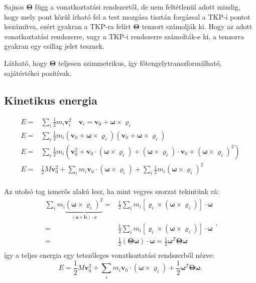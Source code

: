 \documentclass[12pt,a4paper]{scrartcl}
\let\mathbf\bm
\begin{document}
Sajnos ${\mathbf{\Theta }}$ függ a vonatkoztatási rendszertől, de nem feltétlenül adott mindig, hogy mely pont körül írható fel a test mozgása tisztán forgással a TKP-i pontot leszámítva, ezért gyakran a TKP-ra felírt ${\mathbf{\Theta }}$ tenzort számolják ki. Hogy az adott vonatkoztatási rendszerre, vagy a TKP-i rendszerre számolták-e ki, a tenzorra gyakran egy csillag jelet tesznek.

Látható, hogy ${\mathbf{\Theta }}$ teljesen szimmetrikus, így főtengelytranszformálható, sajátértékei pozitívak.

\subsection{Kinetikus energia}
\[\begin{aligned}
  E =  & \sum\limits_i {\frac{1}{2}{m_i}{\mathbf{v}}_i^2} \quad {{\mathbf{v}}_i} = {{\mathbf{v}}_0} + {\mathbf{\omega }} \times {{\mathbf{\varrho }}_i} \\ 
  E =  & \sum\limits_i {\frac{1}{2}{m_i}\left( {{{\mathbf{v}}_0} + {\mathbf{\omega }} \times {{\mathbf{\varrho }}_i}} \right)\left( {{{\mathbf{v}}_0} + {\mathbf{\omega }} \times {{\mathbf{\varrho }}_i}} \right)}  \\ 
  E =  & \sum\limits_i {\frac{1}{2}{m_i}\left( {{\mathbf{v}}_0^2 + {{\mathbf{v}}_0} \cdot \left( {{\mathbf{\omega }} \times {{\mathbf{\varrho }}_i}} \right) + \left( {{\mathbf{\omega }} \times {{\mathbf{\varrho }}_i}} \right) \cdot {{\mathbf{v}}_0} + {{\left( {{\mathbf{\omega }} \times {{\mathbf{\varrho }}_i}} \right)}^2}} \right)}  \\ 
  E =  & \frac{1}{2}M{\mathbf{v}}_0^2 + \sum\limits_i {{m_i}{{\mathbf{v}}_0} \cdot \left( {{\mathbf{\omega }} \times {{\mathbf{\varrho }}_i}} \right)}  + \sum\limits_i {\frac{1}{2}{m_i}{{\left( {{\mathbf{\omega }} \times {{\mathbf{\varrho }}_i}} \right)}^2}}  \\ 
\end{aligned} \]

Az utolsó tag ismerős alakú lesz, ha mint vegyes szorzat tekintünk rá:
\[\begin{aligned}
  \sum\limits_i {{m_i}\underbrace {{{\left( {{\mathbf{\omega }} \times {{\mathbf{\varrho }}_i}} \right)}^2}}_{\left( {{\mathbf{a}} \times {\mathbf{b}}} \right) \cdot {\mathbf{c}}}}  =  & \frac{1}{2}\sum\limits_i {{m_i}} \left[ {{{\mathbf{\varrho }}_i} \times \left( {{\mathbf{\omega }} \times {{\mathbf{\varrho }}_i}} \right)} \right] \cdot {\mathbf{\omega }} \\ 
   =  & \frac{1}{2}\sum\limits_i {{m_i}} \left[ {{{\mathbf{\varrho }}_i} \times \left( {{\mathbf{\omega }} \times {{\mathbf{\varrho }}_i}} \right)} \right] \cdot {\mathbf{\omega }} \\ 
   =  & \frac{1}{2}\left( {{\mathbf{\Theta \omega }}} \right) \cdot {\mathbf{\omega }} = \frac{1}{2}{{\mathbf{\omega }}^T}{\mathbf{\Theta \omega }} \\ 
\end{aligned},\]
így a teljes energia egy tetszőleges vonatkoztatási rendszerből nézve:
\[E = \frac{1}{2}M{\mathbf{v}}_0^2 + \sum\limits_i {{m_i}{{\mathbf{v}}_0} \cdot \left( {{\mathbf{\omega }} \times {{\mathbf{\varrho }}_i}} \right)}  + \frac{1}{2}{{\mathbf{\omega }}^T}{\mathbf{\Theta \omega }}.\]
\end{document}
